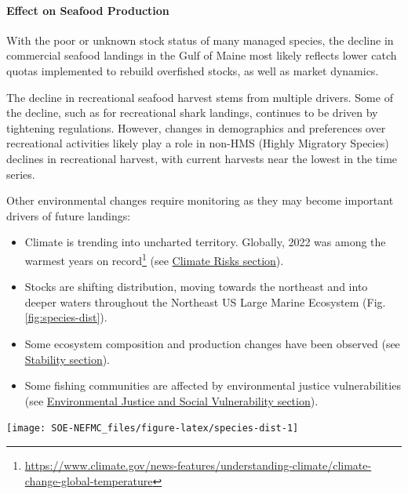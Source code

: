\documentclass[
  10pt,
]{article}
\providecommand{\tightlist}{%
  \setlength{\itemsep}{0pt}\setlength{\parskip}{0pt}}
\let\origfigure\figure
\let\endorigfigure\endfigure
\renewenvironment{figure}[1][2] {
    \expandafter\origfigure\expandafter[H]
} {
    \endorigfigure
}
\begin{document}
\hypertarget{effect-on-seafood-production}{%
\paragraph{Effect on Seafood Production}\label{effect-on-seafood-production}}

With the poor or unknown stock status of many managed species, the decline in commercial seafood landings in the Gulf of Maine most likely reflects lower catch quotas implemented to rebuild overfished stocks, as well as market dynamics.

The decline in recreational seafood harvest stems from multiple drivers. Some of the decline, such as for recreational shark landings, continues to be driven by tightening regulations. However, changes in demographics and preferences over recreational activities likely play a role in non-HMS (Highly Migratory Species) declines in recreational harvest, with current harvests near the lowest in the time series.

Other environmental changes require monitoring as they may become important drivers of future landings:

\begin{itemize}
\tightlist
\item
  Climate is trending into uncharted territory. Globally, 2022 was among the warmest years on record\footnote{\url{https://www.climate.gov/news-features/understanding-climate/climate-change-global-temperature}} (see \protect\hyperlink{climate-and-ecosystem-productivity}{Climate Risks section}).
\item
  Stocks are shifting distribution, moving towards the northeast and into deeper waters throughout the Northeast US Large Marine Ecosystem (Fig. \ref{fig:species-dist}).
\item
  Some ecosystem composition and production changes have been observed (see \protect\hyperlink{stability}{Stability section}).
\item
  Some fishing communities are affected by environmental justice vulnerabilities (see \protect\hyperlink{social-vulnerability}{Environmental Justice and Social Vulnerability section}).
\end{itemize}

\begin{figure}

{\centering \texttt{[image: SOE-NEFMC\_files/figure-latex/species-dist-1]} 

}

\caption{Aggregate species distribution metrics for species in the Northeast Large Marine Ecosystem.}\label{fig:species-dist}
\end{figure}
\end{document}
